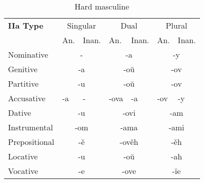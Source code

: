 \begin{table}
	\caption{Hard masculine}
	\begin{tabular}{lllllll}
		\textbf{IIa Type}       
		& \multicolumn{2}{c}{Singular} 
		& \multicolumn{2}{c}{Dual} 
		& \multicolumn{2}{c}{Plural} \\
		& An.   & Inan.  & An.   & Inan.   & An.  & Inan. \\
		Nominative    & \multicolumn{2}{c}{-}      
		& \multicolumn{2}{c}{-a}        
		& \multicolumn{2}{c}{-y} \\
		Genitive      & \multicolumn{2}{c}{-a}       
		& \multicolumn{2}{c}{-oŭ}      
		& \multicolumn{2}{c}{-ov}   \\
		Partitive     & \multicolumn{2}{c}{-u}       
		& \multicolumn{2}{c}{-oŭ}      
		& \multicolumn{2}{c}{-ov} \\
		Accusative    & -a & -      
		& -ova & -a 
		& -ov & -y \\
		Dative        & \multicolumn{2}{c}{-u}       
		& \multicolumn{2}{c}{-ovi}     
		& \multicolumn{2}{c}{-am} \\
		Instrumental  & \multicolumn{2}{c}{-om}     
		& \multicolumn{2}{c}{-ama}     
		& \multicolumn{2}{c}{-ami} \\
		Prepositional & \multicolumn{2}{c}{-ě}       
		& \multicolumn{2}{c}{-ověh}     
		& \multicolumn{2}{c}{-ěh} \\
		Locative      & \multicolumn{2}{c}{-u}      
		& \multicolumn{2}{c}{-oŭ}       
		& \multicolumn{2}{c}{-ah} \\ 
		Vocative      & \multicolumn{2}{c}{-e}       
		& \multicolumn{2}{c}{-ove}      
		& \multicolumn{2}{c}{-ïe}
	\end{tabular}
\end{table}



